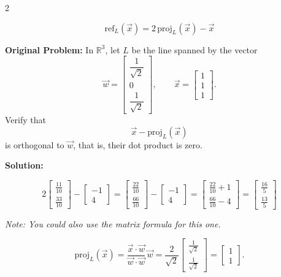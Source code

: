 \documentclass[8pt]{extarticle}
\begin{document}
\begin{multicols}{2}
\begin{tcolorbox}[title=Problem 4 — Original Statement and Solution]
\[
\mathrm{ref}_{L}(\vec{x}) = 2\,\mathrm{proj}_{L}(\vec{x}) - \vec{x}
\]
\end{tcolorbox}

\begin{tcolorbox}[title=Problem 5 — Original Statement and Solution]
\noindent
\textbf{Original Problem:}  
In \(\mathbb{R}^{3}\), let \(L\) be the line spanned by the vector
\[
\vec{w} =
\begin{bmatrix}
\dfrac{1}{\sqrt{2}}\\[6pt]
0\\[6pt]
\dfrac{1}{\sqrt{2}}
\end{bmatrix},
\qquad
\vec{x} =
\begin{bmatrix}
1\\
1\\
1
\end{bmatrix}.
\]
Verify that
\[
\vec{x} - \mathrm{proj}_{L}(\vec{x})
\]
is orthogonal to \(\vec{w}\), that is, their dot product is zero.

\bigskip
\noindent
\textbf{Solution:}

\[
2\begin{bmatrix}
\frac{11}{10}\\[4pt]
\frac{33}{10}
\end{bmatrix}
-
\begin{bmatrix}
-1\\[4pt]
4
\end{bmatrix}
=
\begin{bmatrix}
\frac{22}{10}\\[4pt]
\frac{66}{10}
\end{bmatrix}
-
\begin{bmatrix}
-1\\[4pt]
4
\end{bmatrix}
=
\begin{bmatrix}
\frac{22}{10}+1\\[4pt]
\frac{66}{10}-4
\end{bmatrix}
=
\begin{bmatrix}
\frac{16}{5}\\[4pt]
\frac{13}{5}
\end{bmatrix}
\]

\medskip
\noindent
\textit{Note: You could also use the matrix formula for this one.}

\bigskip
\[
\mathrm{proj}_{L}(\vec{x})
= \frac{\vec{x}\cdot \vec{w}}{\vec{w}\cdot \vec{w}}\,\vec{w}
= \frac{2}{\sqrt{2}}
\begin{bmatrix}
\frac{1}{\sqrt{2}}\\[4pt]
\frac{1}{\sqrt{2}}
\end{bmatrix}
= \begin{bmatrix}1\\1\end{bmatrix}.
\]


\end{tcolorbox}
\end{multicols}
\end{document}

